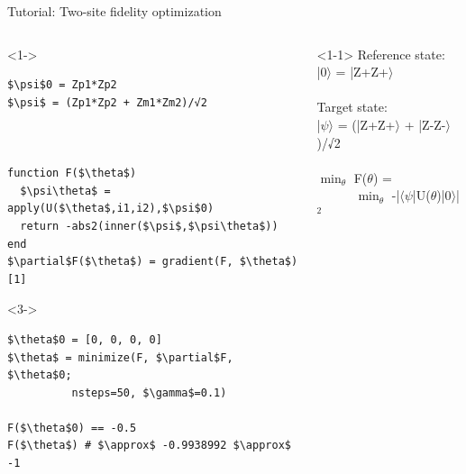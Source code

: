 \begin{frame}[fragile]{Tutorial: Two-site fidelity optimization}

\begin{columns}

\begin{column}{5cm}

\begin{onlyenv}<1->
\begin{lstlisting}[language=JuliaLocal, style=julia, mathescape, basicstyle=\scriptsize\ttfamily]
$\psi$0 = Zp1*Zp2
$\psi$ = (Zp1*Zp2 + Zm1*Zm2)/√2



function F($\theta$)
  $\psi\theta$ = apply(U($\theta$,i1,i2),$\psi$0)
  return -abs2(inner($\psi$,$\psi\theta$))
end
$\partial$F($\theta$) = gradient(F, $\theta$)[1]
\end{lstlisting}
\end{onlyenv}

\begin{onlyenv}<3->
\begin{lstlisting}[language=JuliaLocal, style=julia, mathescape, basicstyle=\scriptsize\ttfamily]
$\theta$0 = [0, 0, 0, 0]
$\theta$ = minimize(F, $\partial$F, $\theta$0;
          nsteps=50, $\gamma$=0.1)

F($\theta$0) == -0.5
F($\theta$) # $\approx$ -0.9938992 $\approx$ -1
\end{lstlisting}
\end{onlyenv}

\end{column}

\begin{column}{5cm}

\begin{onlyenv}<1-1>
Reference state: \\
|0$\rangle$ = |Z+Z+$\rangle$ \\
~\\
Target state: \\
|$\psi\rangle$ = (|Z+Z+$\rangle$ + |Z-Z-$\rangle$)/√2 \\
~\\
$\min_{\theta}$ F($\theta$) = \\
\ \ \ \ \ \ $\min_{\theta}$ -|$\langle\psi$|U($\theta$)|0$\rangle$|$^2$
\end{onlyenv}


\end{column}
\end{columns}
\end{frame}
